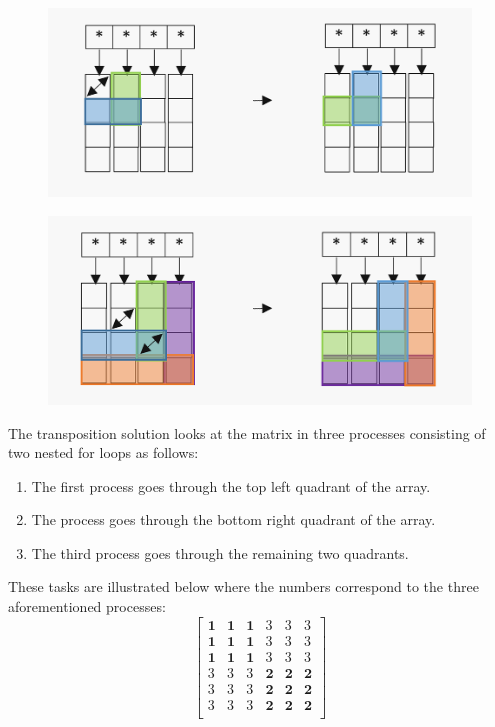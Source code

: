 \documentclass[conference]{IEEEtran}
\begin{document}
\noindent
\begin{figure}[H]
\centering
\includegraphics[scale= 0.4]{Figure2.png}
\caption{}
\end{figure}

\noindent
\begin{figure}[H]
\centering
\includegraphics[scale= 0.4]{Figure3.png}
\caption{}
\end{figure}

The transposition solution looks at the matrix in three processes consisting of two nested for loops as follows:\\

\begin{enumerate}
\item The first process goes through the top left quadrant of the array.
\item The process goes through the bottom right quadrant of the array.
\item The third process goes through the remaining two quadrants.\\
\end{enumerate}

These tasks are illustrated below where the numbers correspond to the three aforementioned processes:\\


\[
\begin{bmatrix}
 \textbf{1} &\textbf{1} & \textbf{1} & 3 & 3 & 3 \\
 \textbf{1} & \textbf{1} & \textbf{1} & 3 & 3 & 3  \\
 \textbf{1} & \textbf{1} & \textbf{1} & 3 & 3 & 3 \\
 3 & 3 & 3 & \textbf{2} & \textbf{2} & \textbf{2} \\
 3 & 3 & 3 & \textbf{2} & \textbf{2} & \textbf{2} \\
 3 & 3 & 3 & \textbf{2} & \textbf{2} & \textbf{2} \\

\end{bmatrix}
\]
\end{document}

